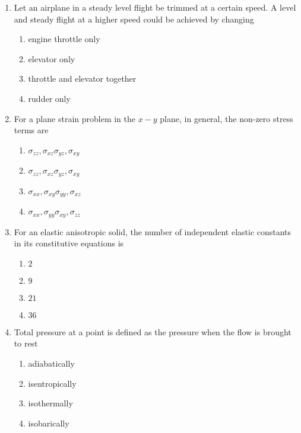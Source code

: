 \documentclass[journal]{IEEEtran}
\begin{document}
\begin{enumerate}
\item Let an airplane in a steady level flight be trimmed at a certain speed. A level and steady flight at a higher speed could be achieved by changing
\begin{multicols}{2}
\begin{enumerate}
\item engine throttle only
\item elevator only
\item throttle and elevator together
\item rudder only
\end{enumerate}
\end{multicols}


\item For a plane strain problem in the $x-y$ plane, in general, the non-zero stress terms are
\begin{multicols}{2}
\begin{enumerate}
\item $\sigma_{zz},\sigma_{xz}\sigma_{yz},\sigma_{xy}$
\item $\sigma_{zz},\sigma_{xz}\sigma_{yz},\sigma_{xy}$
\item $\sigma_{xx},\sigma_{xy}\sigma_{yy},\sigma_{xz}$
\item $\sigma_{xx},\sigma_{yy}\sigma_{xy},\sigma_{zz}$
\end{enumerate}
\end{multicols}


\item For an elastic anisotropic solid, the number of independent elastic constants in its constitutive equations is
\begin{multicols}{2}
\begin{enumerate}
\item $2$
\item $9$
\item $21$
\item $36$
\end{enumerate}
\end{multicols}


\item Total pressure at a point is defined as the pressure when the flow is brought to rest
\begin{multicols}{2}
\begin{enumerate}
\item adiabatically
\item isentropically
\item isothermally
\item isobarically
\end{enumerate}
\end{multicols}



\end{enumerate}
\end{document}

